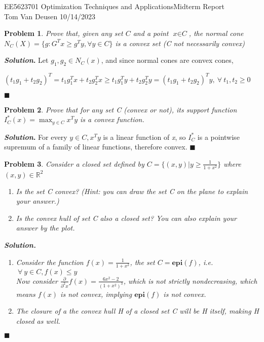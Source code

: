 \documentclass[12pt]{article}
\newtheorem{problem}{Problem}
\newenvironment{solution}[1][\textit{Solution}]{\textbf{#1. }}{$\blacksquare$}
\begin{document}
	\noindent EE5623701 Optimization Techniques and Applications\hfill Midterm Report\\
	Tom Van Deusen \hfill 10/14/2023

	\hrulefill

	\begin{problem}
    Prove that, given any set $\textit{C}$ and a point $\textit{x} \in \textit{C}$, the normal cone $N_C(X) = \{g: G^{T}x \geq g^{T}y, \forall y \in C\}$ is a convex set (C not necessarily convex)  
  \end{problem}
	\begin{solution}
    Let $g_{1}, g_{2} \in N_{C}(x)$, and since normal cones are convex cones,\\ 
    \begin{center}
      $(t_{1}g_{1} + t_{2}g_{2})^{T} = t_{1}g_{1}^{T}x + t_{2}g_{2}^{T}x \geq t_{1}g_{1}^{T}y + t_{2}g_{2}^{T}y = (t_{1}g_{1} + t_{2}g_{2})^{T}y, \ \forall \ t_{1}, t_{2} \geq 0$ 
    \end{center}
	\end{solution}

	\begin{problem}
    Prove that for any set \textit{C} (convex or not), its support function $I_{C}^{*}(x) = \max_{y \in C} x^{T}y$ is a convex function.
	\end{problem}
	\begin{solution}
    For every $y \in C, x^{T}y$ is a linear function of \textit{x}, so $I^{*}_{C}$ is a pointwise supremum of a family of linear functions, therefore convex.
	\end{solution}

  \begin{problem}
    Consider a closed set defined by $C = \{(x,y) | y \geq \frac{1}{1 + x^2}\}$ where $(x,y) \in \mathbb{R}^{2}$
    \begin{enumerate}
      \item Is the set \it{C} convex? (Hint: you can draw the set \it{C} on the plane to explain your answer.) 
      \item  Is the convex hull of set \it{C} also a closed set? You can also explain your answer by the plot.
    \end{enumerate}
    \begin{solution}
      \begin{enumerate}
      \item Consider the function $f(x) = \frac{1}{1 + x^{2}}$, the set $C = \textbf{epi}(f)$, i.e. $\ \forall \ y \in C, f(x) \leq y$\\ 
        Now consider $\frac{\partial}{\partial^{2}x}f(x) = \frac{6x^{2} - 2}{(1 + x^{2})^{3}}$, which is not strictly nondecreasing, which means $f(x)$ is not convex, implying $\textbf{epi}(f)$
is not convex.
      \item The closure of a the convex hull \textit{H} of a closed set \textit{C} will be \textit{H} itself, making \textit{H} closed as well.
      \end{enumerate}
    \end{solution}
  \end{problem}
\end{document}
